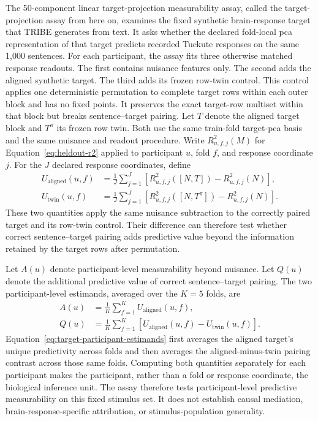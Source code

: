 The 50-component linear target-projection measurability assay, called the target-projection assay from here on, examines the fixed synthetic brain-response target that TRIBE generates from text.
It asks whether the declared fold-local \ac{pca} representation of that target predicts recorded Tuckute responses on the same 1,000 sentences.
For each participant, the assay fits three otherwise matched response readouts.
The first contains nuisance features only.
The second adds the aligned synthetic target.
The third adds its frozen row-twin control.
This control applies one deterministic permutation to complete target rows within each outer block and has no fixed points.
It preserves the exact target-row multiset within that block but breaks sentence--target pairing.
Let \(T\) denote the aligned target block and \(T^\pi\) its frozen row twin.
Both use the same train-fold target-\ac{pca} basis and the same nuisance and readout procedure.
Write \(R_{u,f,j}^2(M)\) for Equation~\ref{eq:heldout-r2} applied to participant \(u\), fold \(f\), and response coordinate \(j\).
For the \(J\) declared response coordinates, define
\begin{equation}
\begin{aligned}
U_{\mathrm{aligned}}(u,f)
&=
\frac{1}{J}\sum_{j=1}^{J}
\left[R_{u,f,j}^2([N,T])-R_{u,f,j}^2(N)\right],
\\
U_{\mathrm{twin}}(u,f)
&=
\frac{1}{J}\sum_{j=1}^{J}
\left[R_{u,f,j}^2([N,T^\pi])-R_{u,f,j}^2(N)\right].
\end{aligned}
\label{eq:target-fold-contrasts}
\end{equation}
These two quantities apply the same nuisance subtraction to the correctly paired target and its row-twin control.
Their difference can therefore test whether correct sentence--target pairing adds predictive value beyond the information retained by the target rows after permutation.

Let \(A(u)\) denote participant-level measurability beyond nuisance.
Let \(Q(u)\) denote the additional predictive value of correct sentence--target pairing.
The two participant-level estimands, averaged over the \(K=5\) folds, are
\begin{equation}
\begin{aligned}
A(u)
&=
\frac{1}{K}\sum_{f=1}^{K}U_{\mathrm{aligned}}(u,f),
\\
Q(u)
&=
\frac{1}{K}\sum_{f=1}^{K}
\left[U_{\mathrm{aligned}}(u,f)-U_{\mathrm{twin}}(u,f)\right].
\end{aligned}
\label{eq:target-participant-estimands}
\end{equation}
Equation~\ref{eq:target-participant-estimands} first averages the aligned target's unique predictivity across folds and then averages the aligned-minus-twin pairing contrast across those same folds.
Computing both quantities separately for each participant makes the participant, rather than a fold or response coordinate, the biological inference unit.
The assay therefore tests participant-level predictive measurability on this fixed stimulus set.
It does not establish causal mediation, brain-response-specific attribution, or stimulus-population generality.

